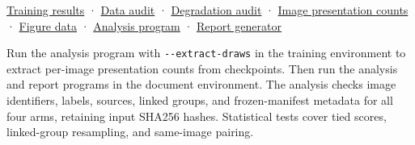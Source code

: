 \documentclass[
  10pt,
]{article}
\begin{document}
\href{../training-results/training-results.en.md}{Training results} ·
\href{../training-results/data-audit.en.md}{Data audit} ·
\href{../training-results/degradation-audit.en.md}{Degradation audit} ·
\href{training-exposure.json}{Image presentation counts} ·
\href{figure-data.json}{Figure data} ·
\href{../../../../tools/analyze_expansion_results_20261113.py}{Analysis
program} ·
\href{../../../../tools/report_expansion_analysis_20261113.py}{Report
generator}

Run the analysis program with \texttt{-\/-extract-draws} in the training
environment to extract per-image presentation counts from checkpoints.
Then run the analysis and report programs in the document environment.
The analysis checks image identifiers, labels, sources, linked groups,
and frozen-manifest metadata for all four arms, retaining input SHA256
hashes. Statistical tests cover tied scores, linked-group resampling,
and same-image pairing.
\end{document}
